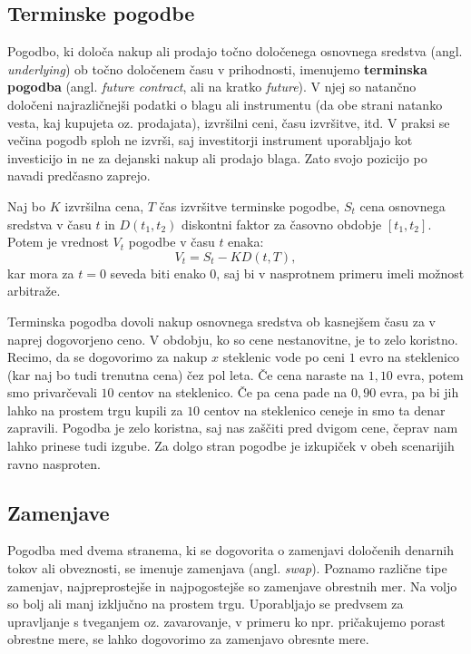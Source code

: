 \documentclass[12pt,a4paper]{amsart}
\theoremstyle{definition} %
\theoremstyle{plain} %
\begin{document}
\subsection{Terminske pogodbe}
Pogodbo, ki določa nakup ali prodajo točno določenega osnovnega sredstva (angl. 
\textit{underlying}) ob točno določenem času v prihodnosti, imenujemo \textbf{terminska 
pogodba} (angl. \textit{future contract}, ali na kratko \textit{future}). V njej so natančno 
določeni najrazličnejši podatki o blagu ali instrumentu (da obe strani natanko vesta, kaj 
kupujeta oz. prodajata), izvršilni ceni, času izvršitve, itd. V praksi se večina pogodb sploh ne izvrši, 
saj investitorji instrument uporabljajo kot investicijo in ne za dejanski nakup ali prodajo blaga. 
Zato svojo pozicijo po navadi predčasno zaprejo.

Naj bo $K$ izvršilna cena, $T$ čas izvršitve terminske pogodbe, 
$S_t$ cena osnovnega sredstva v času $t$ in $D(t_1, t_2)$ 
diskontni faktor za časovno obdobje $[t_1, t_2]$. Potem je vrednost $V_t$ pogodbe 
v času $t$ enaka:
$$V_t = S_t - KD(t, T),$$
kar mora za $t=0$ seveda biti enako $0$, saj bi v nasprotnem primeru imeli možnost 
arbitraže. 

Terminska pogodba dovoli nakup osnovnega sredstva ob kasnejšem času za v naprej 
dogovorjeno ceno. V obdobju, ko so cene nestanovitne, je to zelo koristno. Recimo, 
da se dogovorimo za nakup $x$ steklenic vode po ceni $1$ evro na steklenico (kar naj 
bo tudi trenutna cena) čez pol leta. Če cena naraste na $1,10$ evra, potem smo 
privarčevali $10$ centov na steklenico. Če pa cena pade na $0,90$ evra, pa bi jih 
lahko na prostem trgu kupili za $10$ centov na steklenico ceneje in smo ta denar 
zapravili. Pogodba je zelo koristna, saj nas zaščiti pred dvigom cene, čeprav nam lahko 
prinese tudi izgube. Za dolgo stran pogodbe je izkupiček v obeh scenarijih 
ravno nasproten. 

\subsection{Zamenjave}
Pogodba med dvema stranema, ki se dogovorita o zamenjavi določenih denarnih tokov ali obveznosti, 
se imenuje zamenjava (angl. \textit{swap}). Poznamo različne tipe zamenjav, najpreprostejše 
in najpogostejše so zamenjave obrestnih mer. Na voljo so bolj ali manj izključno na prostem 
trgu. Uporabljajo se predvsem za upravljanje s tveganjem oz. zavarovanje, v primeru ko 
npr. pričakujemo porast obrestne mere, se lahko dogovorimo za zamenjavo obresnte mere. 
\end{document}
